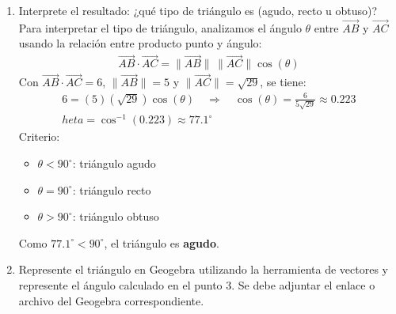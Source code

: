 \documentclass{article}
\begin{document}
\begin{enumerate}
    \item Interprete el resultado: ¿qué tipo de triángulo es (agudo, recto u obtuso)?\\
    Para interpretar el tipo de triángulo, analizamos el ángulo $\theta$ entre $\vec{AB}$ y $\vec{AC}$ usando la relación entre producto punto y ángulo:
    \begin{gather*}
        \vec{AB}\cdot\vec{AC} = \|\vec{AB}\|\,\|\vec{AC}\|\cos(\theta)
    \end{gather*}
    Con $\vec{AB}\cdot\vec{AC}=6$, $\|\vec{AB}\|=5$ y $\|\vec{AC}\|=\sqrt{29}$, se tiene:
    \begin{gather*}
        6 = (5)(\sqrt{29})\cos(\theta) \quad \Rightarrow \quad \cos(\theta)=\frac{6}{5\sqrt{29}} \approx 0.223 \\
        	heta = \cos^{-1}(0.223) \approx 77.1^\circ
    \end{gather*}
    Criterio:
    \begin{itemize}
        \item $\theta<90^\circ$: triángulo agudo
        \item $\theta=90^\circ$: triángulo recto
        \item $\theta>90^\circ$: triángulo obtuso
    \end{itemize}
    Como $77.1^\circ<90^\circ$, el triángulo es \textbf{agudo}.
    \item Represente el triángulo en Geogebra utilizando la herramienta de vectores y represente el ángulo calculado en el punto 3. Se debe adjuntar el enlace o archivo del Geogebra correspondiente.
\end{enumerate}
\end{document}
